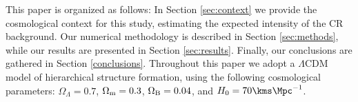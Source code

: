 This paper is organized as follows: In Section \ref{sec:context} we provide the cosmological context for this study, estimating the expected intensity of the CR background. Our numerical methodology is described in Section \ref{sec:methods}, while our results are presented in Section \ref{sec:results}.  Finally, our conclusions are gathered in Section \ref{conclusions}. Throughout this paper we adopt a $\Lambda$CDM model of hierarchical structure formation, using the following cosmological parameters: $\Omega_{\Lambda} = 0.7$, $\Omega_{\rm m} = 0.3$, $\Omega_{\rm B} = 0.04$, and $H_0 = 70 \kms \Mpc^{-1}$.